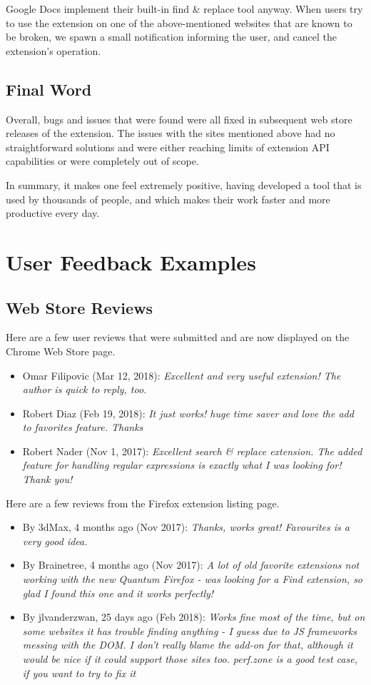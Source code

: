 \documentclass[bsc,frontabs,twoside,singlespacing,parskip,deptreport]{infthesis}
\begin{document}
Google Docs implement their built-in find \& replace tool anyway. When users try to use the extension on one of the above-mentioned websites that are known to be broken, we spawn a small notification informing the user, and cancel the extension's operation.

\section{Final Word}
Overall, bugs and issues that were found were all fixed in subsequent web store releases of the extension. The issues with the sites mentioned above had no straightforward solutions and were either reaching limits of extension API capabilities or were completely out of scope.

In summary, it makes one feel extremely positive, having developed a tool that is used by thousands of people, and which makes their work faster and more productive every day.

\appendix
\chapter{User Feedback Examples}

\section{Web Store Reviews}
\label{section:feedback-reviews}
Here are a few user reviews that were submitted and are now displayed on the Chrome Web Store page.
\begin{itemize}
\item
Omar Filipovic (Mar 12, 2018): \textit{Excellent and very useful extension! The author is quick to reply, too.}
\item
Robert Diaz (Feb 19, 2018): \textit{It just works! huge time saver and love the add to favorites feature. Thanks}
\item
Robert Nader (Nov 1, 2017): \textit{Excellent search \& replace extension. The added feature for handling regular expressions is exactly what I was looking for! Thank you!}
\end{itemize}

Here are a few reviews from the Firefox extension listing page.
\begin{itemize}
\item
By 3dMax, 4 months ago (Nov 2017): \textit{Thanks, works great! Favourites is a very good idea.}
\item
By Brainetree, 4 months ago (Nov 2017): \textit{A lot of old favorite extensions not working with the new Quantum Firefox - was looking for a Find extension, so glad I found this one and it works perfectly!}
\item
By jlvanderzwan, 25 days ago (Feb 2018): \textit{Works fine most of the time, but on some websites it has trouble finding anything - I guess due to JS frameworks messing with the DOM. I don't really blame the add-on for that, although it would be nice if it could support those sites too. perf.zone is a good test case, if you want to try to fix it}
\end{itemize}
\end{document}
